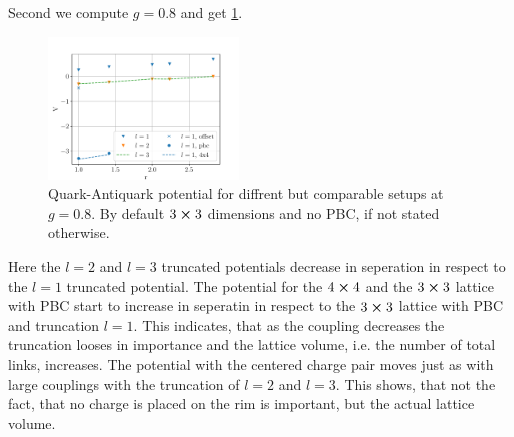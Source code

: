 Second we compute $g=0.8$ and get \cref{fig:qqbars}.
\begin{figure}[h]
	\begin{center}
		\includegraphics[width=0.45\textwidth]{images/quark_antiquark_potential_small_g.pdf}
	\end{center}
  \caption{Quark-Antiquark potential for diffrent but comparable setups at $g=\num{0.8}$. By default $3\cross3$ dimensions and no PBC, if not stated otherwise.}\label{fig:qqbars}
\end{figure}
Here the $l=2$ and $l=3$ truncated potentials decrease in seperation in respect to the $l=1$ truncated potential. The potential for the $4\cross 4$ and the $3\cross3$ lattice with PBC start to increase in seperatin in respect to the $3\cross3$ lattice with PBC and truncation $l=1$. This indicates, that as the coupling decreases the truncation looses in importance and the lattice volume, i.e. the number of total links, increases. The potential with the centered charge pair moves just as with large couplings with the truncation of $l=2$ and $l=3$. This shows, that not the fact, that no charge is placed on the rim is important, but the actual lattice volume.

